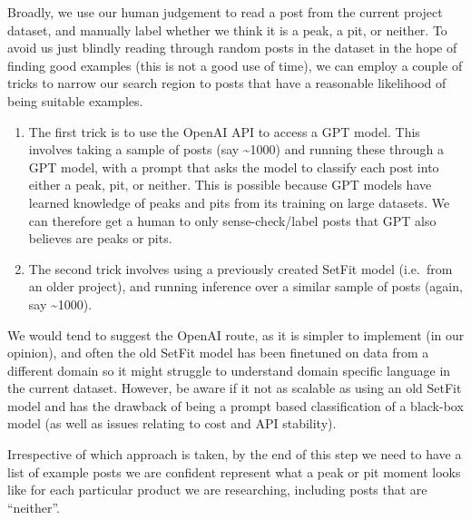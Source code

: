 \documentclass[
  letterpaper,
  DIV=11,
  numbers=noendperiod]{scrreprt}
\begin{document}
Broadly, we use our human judgement to read a post from the current
project dataset, and manually label whether we think it is a peak, a
pit, or neither. To avoid us just blindly reading through random posts
in the dataset in the hope of finding good examples (this is not a good
use of time), we can employ a couple of tricks to narrow our search
region to posts that have a reasonable likelihood of being suitable
examples.

\begin{enumerate}
\def\labelenumi{\arabic{enumi})}
\item
  The first trick is to use the OpenAI API to access a GPT model. This
  involves taking a sample of posts (say \textasciitilde1000) and
  running these through a GPT model, with a prompt that asks the model
  to classify each post into either a peak, pit, or neither. This is
  possible because GPT models have learned knowledge of peaks and pits
  from its training on large datasets. We can therefore get a human to
  only sense-check/label posts that GPT also believes are peaks or pits.
\item
  The second trick involves using a previously created SetFit model
  (i.e.~from an older project), and running inference over a similar
  sample of posts (again, say \textasciitilde1000).
\end{enumerate}

We would tend to suggest the OpenAI route, as it is simpler to implement
(in our opinion), and often the old SetFit model has been finetuned on
data from a different domain so it might struggle to understand domain
specific language in the current dataset. However, be aware if it not as
scalable as using an old SetFit model and has the drawback of being a
prompt based classification of a black-box model (as well as issues
relating to cost and API stability).

Irrespective of which approach is taken, by the end of this step we need
to have a list of example posts we are confident represent what a peak
or pit moment looks like for each particular product we are researching,
including posts that are ``neither''.
\end{document}
